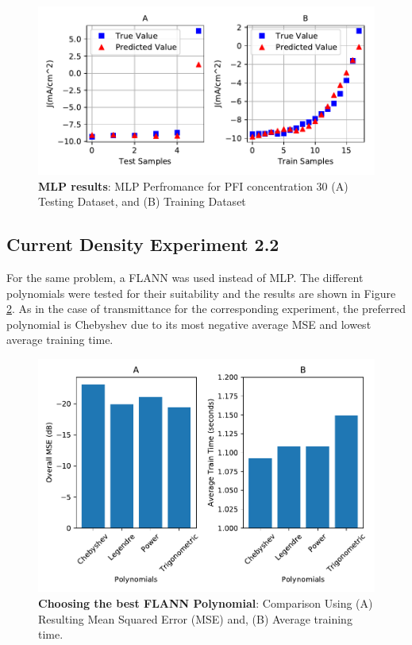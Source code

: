 \documentclass[]{article}
\begin{document}
\begin{figure}
\centering
\includegraphics{Report_files/figure-latex/JVplot30-1.pdf}
\caption{\label{fig:JVplot30}\textbf{MLP results}: MLP Perfromance for PFI concentration 30 (A) Testing Dataset, and (B) Training Dataset}
\end{figure}

\newpage

\hypertarget{current-density-experiment-2.2}{%
\subsection{Current Density Experiment 2.2}\label{current-density-experiment-2.2}}

For the same problem, a FLANN was used instead of MLP. The different polynomials were tested for their suitability and the results are shown in Figure \ref{fig:jvflannbar}. As in the case of transmittance for the corresponding experiment, the preferred polynomial is Chebyshev due to its most negative average MSE and lowest average training time.

\begin{figure}
\centering
\includegraphics{Report_files/figure-latex/jvflannbar-1.pdf}
\caption{\label{fig:jvflannbar}\textbf{Choosing the best FLANN Polynomial}: Comparison Using (A) Resulting Mean Squared Error (MSE) and, (B) Average training time.}
\end{figure}
\end{document}
